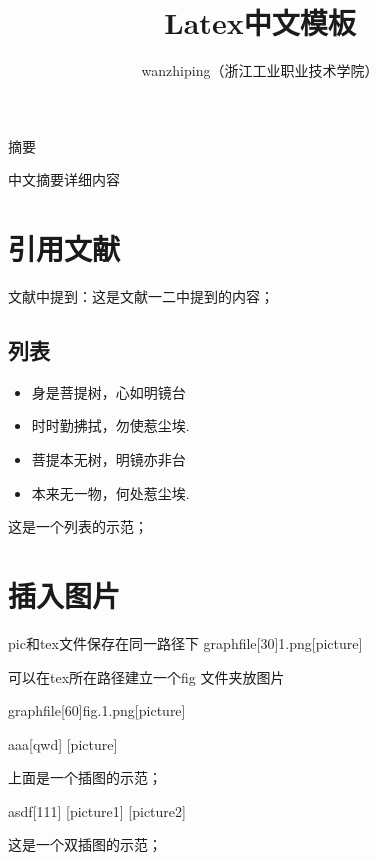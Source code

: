\documentclass[UTF8,a4paper,10pt]{article}
\title{\textbf{\huge{Latex中文模板}}}
\author{wanzhiping（浙江工业职业技术学院）}
\begin{document}
\newcommand{\supercite}[1]{\textsuperscript{\cite{#1}}}
\maketitle

\begin{center}摘要\end{center}
中文摘要详细内容

\newpage
\tableofcontents
\newpage

\section{引用文献}
\indent 文献\supercite{ref1,ref2}中提到：这是文献一二中提到的内容；
\subsection{列表}
\begin{itemize}  \item 身是菩提树，心如明镜台  \item 时时勤拂拭，勿使惹尘埃.  \item 菩提本无树，明镜亦非台  \item 本来无一物，何处惹尘埃.  \end{itemize}\par
这是一个列表的示范；

\section{插入图片}
pic和tex文件保存在同一路径下  graphfile[30]1.png[picture]\par
可以在tex所在路径建立一个fig 文件夹放图片\par
graphfile[60]fig.1.png[picture]\par
\begin{Figure}[H]{aaa}[qwd]
[picture]
\end{Figure}
\par
上面是一个插图的示范；\par
\begin{Figure}[H]{asdf}[111]  [picture1]  [picture2]  \par  \end{Figure}
\par 这是一个双插图的示范；\par
\end{document}
